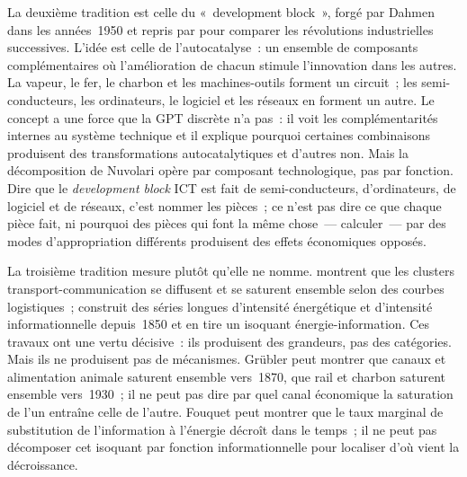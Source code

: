 La deuxième tradition est celle du «~development block~», forgé par Dahmen dans les années~1950 et repris par \textcite{nuvolari_understanding_2020} pour comparer les révolutions industrielles successives. L'idée est celle de l'autocatalyse~: un ensemble de composants complémentaires où l'amélioration de chacun stimule l'innovation dans les autres. La vapeur, le fer, le charbon et les machines-outils forment un circuit~; les semi-conducteurs, les ordinateurs, le logiciel et les réseaux en forment un autre. Le concept a une force que la GPT discrète n'a pas~: il voit les complémentarités internes au système technique et il explique pourquoi certaines combinaisons produisent des transformations autocatalytiques et d'autres non. Mais la décomposition de Nuvolari opère par composant technologique, pas par fonction. Dire que le \emph{development block} ICT est fait de semi-conducteurs, d'ordinateurs, de logiciel et de réseaux, c'est nommer les pièces~; ce n'est pas dire ce que chaque pièce fait, ni pourquoi des pièces qui font la même chose~--- calculer~--- par des modes d'appropriation différents produisent des effets économiques opposés.

La troisième tradition mesure plutôt qu'elle ne nomme. \textcite{grubler_rise_1990,grubler_technology_1998} montrent que les clusters transport-communication se diffusent et se saturent ensemble selon des courbes logistiques~; \textcite{fouquet_digitalisation_2023} construit des séries longues d'intensité énergétique et d'intensité informationnelle depuis~1850 et en tire un isoquant énergie-information. Ces travaux ont une vertu décisive~: ils produisent des grandeurs, pas des catégories. Mais ils ne produisent pas de mécanismes. Grübler peut montrer que canaux et alimentation animale saturent ensemble vers~1870, que rail et charbon saturent ensemble vers~1930~; il ne peut pas dire par quel canal économique la saturation de l'un entraîne celle de l'autre. Fouquet peut montrer que le taux marginal de substitution de l'information à l'énergie décroît dans le temps~; il ne peut pas décomposer cet isoquant par fonction informationnelle pour localiser d'où vient la décroissance.

